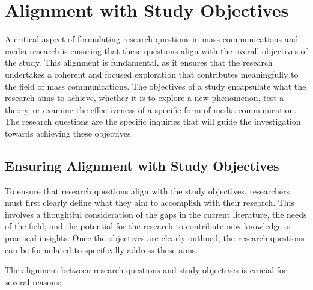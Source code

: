 \documentclass[
]{book}
\begin{document}
\hypertarget{alignment-with-study-objectives}{%
\section*{Alignment with Study Objectives}\label{alignment-with-study-objectives}}

A critical aspect of formulating research questions in mass communications and media research is ensuring that these questions align with the overall objectives of the study. This alignment is fundamental, as it ensures that the research undertakes a coherent and focused exploration that contributes meaningfully to the field of mass communications. The objectives of a study encapsulate what the research aims to achieve, whether it is to explore a new phenomenon, test a theory, or examine the effectiveness of a specific form of media communication. The research questions are the specific inquiries that will guide the investigation towards achieving these objectives.

\hypertarget{ensuring-alignment-with-study-objectives}{%
\subsection*{Ensuring Alignment with Study Objectives}\label{ensuring-alignment-with-study-objectives}}

To ensure that research questions align with the study objectives, researchers must first clearly define what they aim to accomplish with their research. This involves a thoughtful consideration of the gaps in the current literature, the needs of the field, and the potential for the research to contribute new knowledge or practical insights. Once the objectives are clearly outlined, the research questions can be formulated to specifically address these aims.

The alignment between research questions and study objectives is crucial for several reasons:
\end{document}
